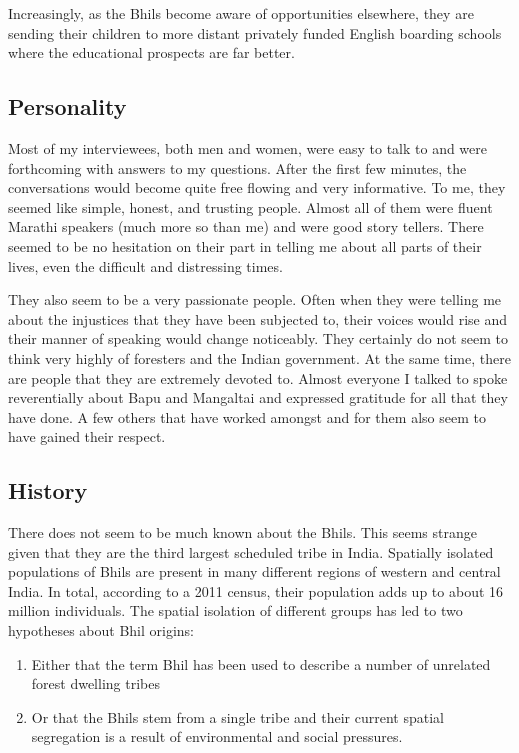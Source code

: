 \documentclass[report.tex]{subfiles}
\begin{document}
Increasingly, as the Bhils become aware of opportunities elsewhere, they are sending their children to more distant privately funded English boarding schools where the educational prospects are far better.

\subsection{Personality}\label{subsec:personality}

Most of my interviewees, both men and women, were easy to talk to and were forthcoming with answers to my questions. After the first few minutes, the conversations would become quite free flowing and very informative. To me, they seemed like simple, honest, and trusting people. Almost all of them were fluent Marathi speakers (much more so than me) and were good story tellers. There seemed to be no hesitation on their part in telling me about all parts of their lives, even the difficult and distressing times.

They also seem to be a very passionate people. Often when they were telling me about the injustices that they have been subjected to, their voices would rise and their manner of speaking would change noticeably. They certainly do not seem to think very highly of foresters and the Indian government. At the same time, there are people that they are extremely devoted to. Almost everyone I talked to spoke reverentially about Bapu and Mangaltai and expressed gratitude for all that they have done. A few others that have worked amongst and for them also seem to have gained their respect.

\subsection{History}\label{subsec:history}

There does not seem to be much known about the Bhils. This seems strange given that they are the third largest scheduled tribe in India. Spatially isolated populations of Bhils are present in many different regions of western and central India. In total, according to a 2011 census, their population adds up to about 16 million individuals. The spatial isolation of different groups has led to two hypotheses about Bhil origins:
\begin{enumerate}
\item Either that the term Bhil has been used to describe a number of unrelated forest dwelling tribes
\item Or that the Bhils stem from a single tribe and their current spatial segregation is a result of environmental and social pressures.
\end{enumerate}
\end{document}
